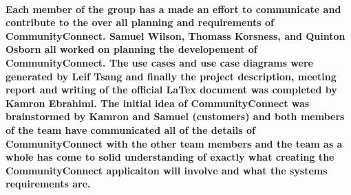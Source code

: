 \documentclass[12pt]{article}
\begin{document}
		\paragraph{\normalfont \indent Each member of the group has a made an effort to communicate and contribute to the over all planning and requirements of CommunityConnect. Samuel Wilson, Thomass Korsness, and Quinton Osborn all worked on planning the developement of CommunityConnect. The use cases and use case diagrams were generated by Leif Tsang and finally the project description, meeting report and writing of the official LaTex document was completed by Kamron Ebrahimi. The initial idea of CommunityConnect was brainstormed by Kamron and Samuel (customers) and both members of the team have communicated all of the details of CommunityConnect with the other team members and the team as a whole has come to solid understanding of exactly what creating the CommunityConnect applicaiton will involve and what the systems requirements are.}



\end{document}
